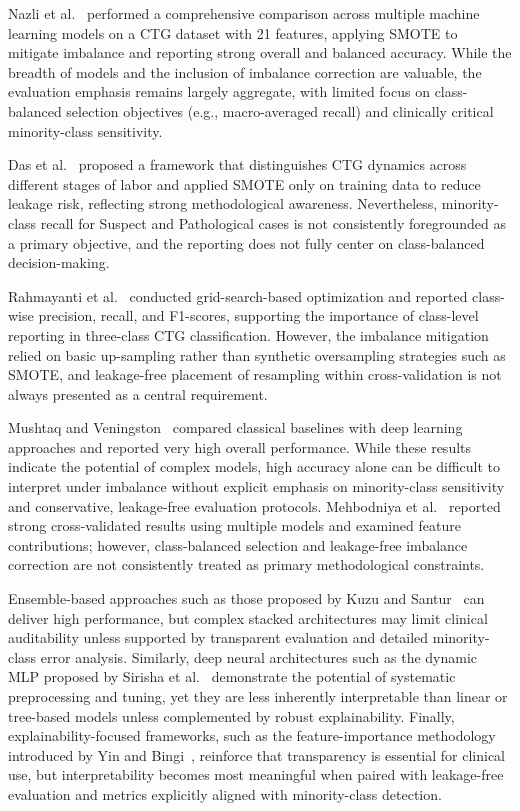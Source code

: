 \documentclass[sigconf]{acmart}
\begin{document}
Nazli et al.~\cite{nazli2025} performed a comprehensive comparison across multiple machine learning models on a CTG dataset with 21 features, applying SMOTE to mitigate imbalance and reporting strong overall and balanced accuracy. While the breadth of models and the inclusion of imbalance correction are valuable, the evaluation emphasis remains largely aggregate, with limited focus on class-balanced selection objectives (e.g., macro-averaged recall) and clinically critical minority-class sensitivity.

Das et al.~\cite{das2023} proposed a framework that distinguishes CTG dynamics across different stages of labor and applied SMOTE only on training data to reduce leakage risk, reflecting strong methodological awareness. Nevertheless, minority-class recall for Suspect and Pathological cases is not consistently foregrounded as a primary objective, and the reporting does not fully center on class-balanced decision-making.

Rahmayanti et al.~\cite{rahmayanti2022} conducted grid-search-based optimization and reported class-wise precision, recall, and F1-scores, supporting the importance of class-level reporting in three-class CTG classification. However, the imbalance mitigation relied on basic up-sampling rather than synthetic oversampling strategies such as SMOTE, and leakage-free placement of resampling within cross-validation is not always presented as a central requirement.

Mushtaq and Veningston~\cite{mushtaq2024} compared classical baselines with deep learning approaches and reported very high overall performance. While these results indicate the potential of complex models, high accuracy alone can be difficult to interpret under imbalance without explicit emphasis on minority-class sensitivity and conservative, leakage-free evaluation protocols. Mehbodniya et al.~\cite{mehbodniya2022} reported strong cross-validated results using multiple models and examined feature contributions; however, class-balanced selection and leakage-free imbalance correction are not consistently treated as primary methodological constraints.

Ensemble-based approaches such as those proposed by Kuzu and Santur~\cite{kuzu2023} can deliver high performance, but complex stacked architectures may limit clinical auditability unless supported by transparent evaluation and detailed minority-class error analysis. Similarly, deep neural architectures such as the dynamic MLP proposed by Sirisha et al.~\cite{sirisha2024} demonstrate the potential of systematic preprocessing and tuning, yet they are less inherently interpretable than linear or tree-based models unless complemented by robust explainability. Finally, explainability-focused frameworks, such as the feature-importance methodology introduced by Yin and Bingi~\cite{yin2023}, reinforce that transparency is essential for clinical use, but interpretability becomes most meaningful when paired with leakage-free evaluation and metrics explicitly aligned with minority-class detection.
\end{document}
